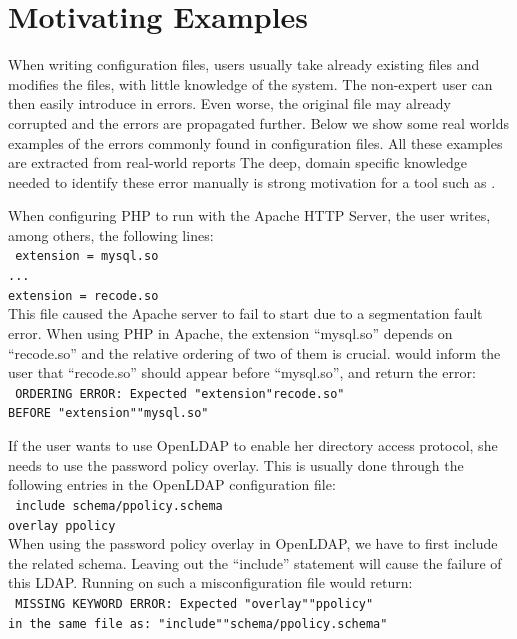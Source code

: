 \section{Motivating Examples}
\label{sec:motiv}

When writing configuration files, users usually take already existing
files and modifies the files, with little knowledge of the system. 
The non-expert user can then easily introduce in errors.
Even worse, the original file may already corrupted and the errors are propagated further. 
Below we show some real worlds examples of the errors commonly found in configuration files.
All these examples are extracted from real-world reports %
The deep, domain specific knowledge needed to identify these error manually is strong motivation for a tool such as \app.

 When configuring PHP to run with the
Apache HTTP Server, the user writes, among others, the following lines:\\
 \texttt{
 \hspace*{3em}extension = mysql.so\\
 \hspace*{3em}...\\
 \hspace*{3em}extension = recode.so}\\
This file caused the Apache server to fail to start due to a segmentation fault error.
When using PHP in Apache, the extension ``mysql.so'' depends on ``recode.so'' and the relative ordering of two of them is crucial. 
\app would inform the user that ``recode.so'' should appear before ``mysql.so'', and return the error:\\
 \texttt{
ORDERING ERROR: Expected "extension"recode.so"\\
   BEFORE "extension""mysql.so"
  }

 If the user wants to use OpenLDAP to enable her directory access
protocol, she needs to use the password policy overlay. This is usually
done through the following entries in the OpenLDAP configuration file:\\
\texttt{
 \hspace*{3em}include schema/ppolicy.schema\\
 \hspace*{3em}overlay ppolicy\\}
When using the password policy overlay in OpenLDAP, we have to first include the related schema.
Leaving out the ``include'' statement will cause the failure of 
this LDAP. Running \app on such a misconfiguration file would return:\\
\texttt{
MISSING KEYWORD ERROR: Expected "overlay""ppolicy"\\ 
in the same file as: "include""schema/ppolicy.schema"}


